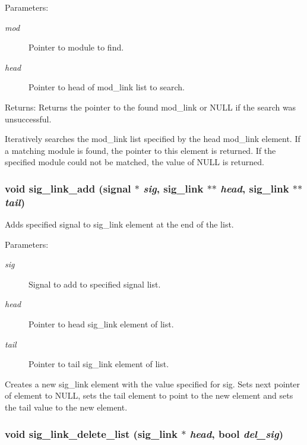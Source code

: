 \begin{Desc}
\item[Parameters:]
\begin{description}
\item[{\em mod}]Pointer to module to find. \item[{\em head}]Pointer to head of mod\_\-link list to search.\end{description}
\end{Desc}
\begin{Desc}
\item[Returns:]Returns the pointer to the found mod\_\-link or NULL if the search was unsuccessful.\end{Desc}
Iteratively searches the mod\_\-link list specified by the head mod\_\-link element. If a matching module is found, the pointer to this element is returned. If the specified module could not be matched, the value of NULL is returned. 
\subsubsection{\setlength{\rightskip}{0pt plus 5cm}void sig\_\-link\_\-add ({\bf signal} $\ast$ {\em sig}, {\bf sig\_\-link} $\ast$$\ast$ {\em head}, {\bf sig\_\-link} $\ast$$\ast$ {\em tail})}\label{link_8c_a4}


Adds specified signal to sig\_\-link element at the end of the list. 

\begin{Desc}
\item[Parameters:]
\begin{description}
\item[{\em sig}]Signal to add to specified signal list. \item[{\em head}]Pointer to head sig\_\-link element of list. \item[{\em tail}]Pointer to tail sig\_\-link element of list.\end{description}
\end{Desc}
Creates a new sig\_\-link element with the value specified for sig. Sets next pointer of element to NULL, sets the tail element to point to the new element and sets the tail value to the new element. 
\subsubsection{\setlength{\rightskip}{0pt plus 5cm}void sig\_\-link\_\-delete\_\-list ({\bf sig\_\-link} $\ast$ {\em head}, {\bf bool} {\em del\_\-sig})}\label{link_8c_a21}



